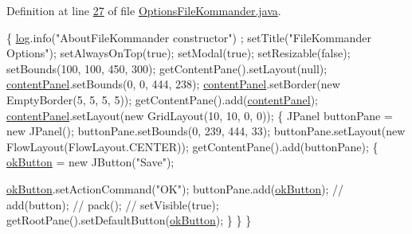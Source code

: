 Definition at line \hyperlink{L27}{27} of file \hyperlink{}{Options\-File\-Kommander.\-java}.


\begin{DoxyCode}
                                  \{
        \hyperlink{classcom_1_1poly_1_1nlp_1_1filekommander_1_1views_1_1_options_file_kommander_aaf488bac9983e9c54d0470f623d038a9}{log}.info(\textcolor{stringliteral}{"AboutFileKommander constructor"}) ;
        setTitle(\textcolor{stringliteral}{"FileKommander Options"});
        setAlwaysOnTop(\textcolor{keyword}{true});
        setModal(\textcolor{keyword}{true});
        setResizable(\textcolor{keyword}{false});
        setBounds(100, 100, 450, 300);
        getContentPane().setLayout(null);
        \hyperlink{classcom_1_1poly_1_1nlp_1_1filekommander_1_1views_1_1_options_file_kommander_a566cf729d42553b326dc4eaaf52cd9d8}{contentPanel}.setBounds(0, 0, 444, 238);
        \hyperlink{classcom_1_1poly_1_1nlp_1_1filekommander_1_1views_1_1_options_file_kommander_a566cf729d42553b326dc4eaaf52cd9d8}{contentPanel}.setBorder(\textcolor{keyword}{new} EmptyBorder(5, 5, 5, 5));
        getContentPane().add(\hyperlink{classcom_1_1poly_1_1nlp_1_1filekommander_1_1views_1_1_options_file_kommander_a566cf729d42553b326dc4eaaf52cd9d8}{contentPanel});
        \hyperlink{classcom_1_1poly_1_1nlp_1_1filekommander_1_1views_1_1_options_file_kommander_a566cf729d42553b326dc4eaaf52cd9d8}{contentPanel}.setLayout(\textcolor{keyword}{new} GridLayout(10, 10, 0, 0));
        \{
            JPanel buttonPane = \textcolor{keyword}{new} JPanel();
            buttonPane.setBounds(0, 239, 444, 33);
            buttonPane.setLayout(\textcolor{keyword}{new} FlowLayout(FlowLayout.CENTER));
            getContentPane().add(buttonPane);
            \{
                \hyperlink{classcom_1_1poly_1_1nlp_1_1filekommander_1_1views_1_1_options_file_kommander_a0f8aef931bc85b51505210be4fbc87e1}{okButton} = \textcolor{keyword}{new} JButton(\textcolor{stringliteral}{"Save"});
                
                \hyperlink{classcom_1_1poly_1_1nlp_1_1filekommander_1_1views_1_1_options_file_kommander_a0f8aef931bc85b51505210be4fbc87e1}{okButton}.setActionCommand(\textcolor{stringliteral}{"OK"});
                buttonPane.add(\hyperlink{classcom_1_1poly_1_1nlp_1_1filekommander_1_1views_1_1_options_file_kommander_a0f8aef931bc85b51505210be4fbc87e1}{okButton});
                \textcolor{comment}{// add(button);}
                \textcolor{comment}{// pack();}
                \textcolor{comment}{// setVisible(true);}
                getRootPane().setDefaultButton(\hyperlink{classcom_1_1poly_1_1nlp_1_1filekommander_1_1views_1_1_options_file_kommander_a0f8aef931bc85b51505210be4fbc87e1}{okButton});
            \}
        \}
    \}
\end{DoxyCode}


